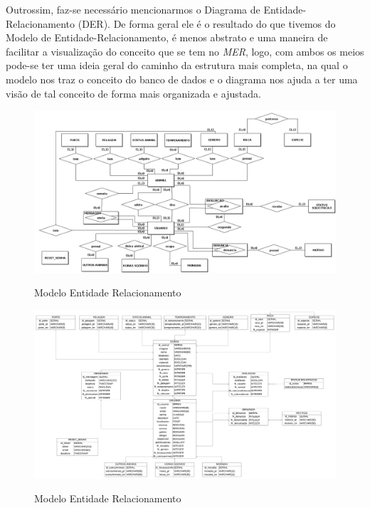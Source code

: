 Outrossim, faz-se necessário mencionarmos o Diagrama de Entidade-Relacionamento (DER). De forma geral ele é o resultado do que tivemos do Modelo de Entidade-Relacionamento, é menos abstrato e uma maneira de facilitar a visualização do conceito que se tem no \textit{MER}, logo, com ambos os meios pode-se ter uma ideia geral do caminho da estrutura mais completa, na qual o modelo nos traz o conceito do banco de dados e o diagrama nos ajuda a ter uma visão de tal conceito de forma mais organizada e ajustada.

\begin{figure}
    \centering
    \caption{Modelo Entidade Relacionamento}
    \includegraphics[scale=0.5,angle=90]{imagens/MODELOCONCEITUAL.png}
    \label{mer}
\end{figure}

\begin{figure}
    \centering
    \caption{Modelo Entidade Relacionamento}
    \includegraphics[scale=0.5,angle=90]{imagens/MODELOLOGICO.png}
    \label{der}
\end{figure}

